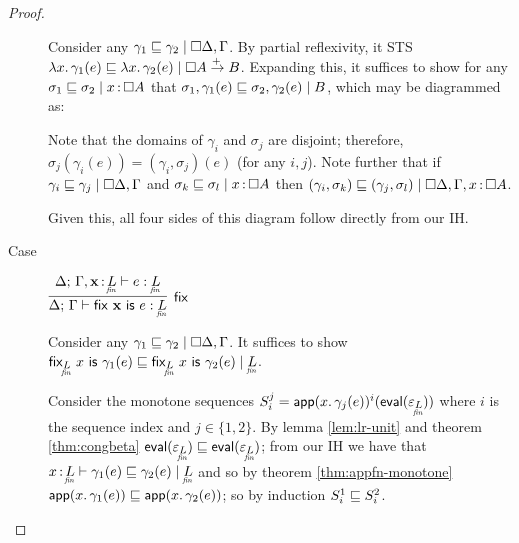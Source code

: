 \documentclass{article}
\begin{document}
\begin{proof}
\begin{description}
    Consider any $\lr{\cxdisc{\GD},\GG}{\gamma_1 \ale \gamma_2}$. By partial
    reflexivity, it STS $\lr{\disc{A} \mto B}{\fn\bind{x} \gamma_1(e) \ale
      \fn\bind{x} \gamma_2(e)}$. Expanding this, it suffices to show for any
    $\lr{x \of \disc{A}}{\sigma_1 \ale \sigma_2}$ that
    $\commsq{B}{\sigma_1}{\sigma_2}{\gamma_1(e)}{\gamma_2(e)}$, which may be
    diagrammed as:
    \begin{center}
              {}
    \end{center}

    Note that the domains of $\gamma_i$ and $\sigma_j$ are disjoint; therefore,
    $\sigma_j(\gamma_i(e)) = (\gamma_i,\sigma_j)(e)$ (for any $i,j$). Note
    further that if $\lr{\cxdisc{\GD},\GG}{\gamma_i \ale \gamma_j}$ and
    $\lr{x\of\disc{A}}{\sigma_k \ale \sigma_l}$ then
    $\lr{\cxdisc{\GD},\GG,x\of\disc{A}}{(\gamma_i,\sigma_k) \ale
      (\gamma_j,\sigma_l)}$.

    Given this, all four sides of this diagram follow directly from our IH.


    \vspace{1em}
  \item[Case] $\infer[\ms{fix}]{\J{\GD}{\GG}{\fix{\m{x}} e}{\fineq{L}}}{
    \J{\GD}{\GG,\m{x}\of \fineq{L}}{e}{\fineq{L}}}$

    Consider any $\lr{\cxdisc{\GD},\GG}{\gamma_1 \ale \gamma_2}$. It suffices to
    show $\lr{\fineq{L}}{\tfix{\fineq{L}}{x}{\gamma_1(e)} \ale
      \tfix{\fineq{L}}{x}{\gamma_2(e)}}$.

    Consider the monotone sequences $S^j_i =
    \nthapp{x}{\gamma_j(e)}{i}{\evalfn(\unit_{\fineq{L}})}$ where $i$ is the
    sequence index and $j \in \{1,2\}$. By lemma \ref{lem:lr-unit} and theorem
    \ref{thm:congbeta} $\evalfn(\unit_{\fineq{L}}) \ale
    \evalfn(\unit_{\fineq{L}})$; from our IH we have that
    $\lrcx{x\of\fineq{L}}{\fineq{L}}{\gamma_1(e) \ale \gamma_2(e)}$ and so by
    theorem \ref{thm:appfn-monotone} $\appfn{x}{\gamma_1(e)} \ale
    \appfn{x}{\gamma_2(e)}$; so by induction $S_i^1 \ale S_i^2$.


\end{description}
\end{proof}
\end{document}
